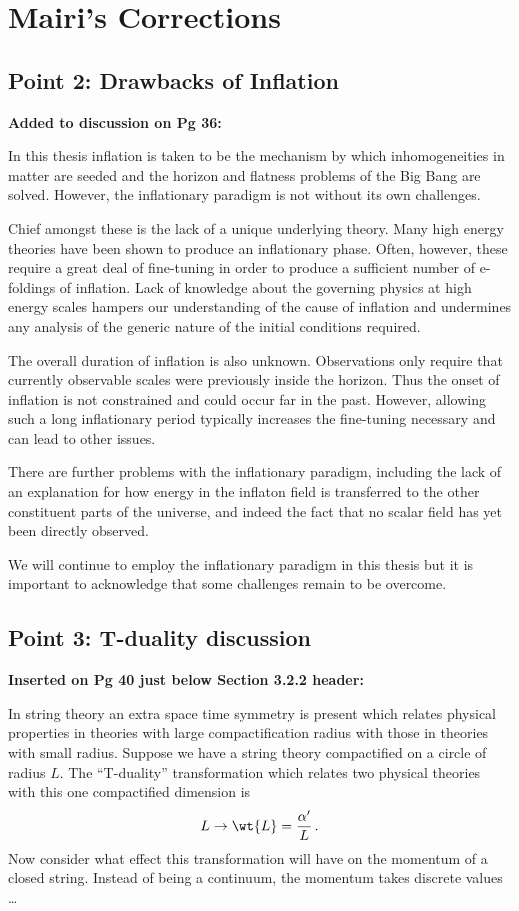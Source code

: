 \section{Mairi's Corrections}

\subsection{Point 2: Drawbacks of Inflation}
\textbf{Added to discussion on Pg 36:}

In this thesis inflation is taken to be the mechanism by which inhomogeneities in matter are seeded
and the horizon and flatness problems of the Big Bang are solved. However, the inflationary
paradigm is not without its own challenges.

Chief amongst these is the lack of a unique underlying theory. Many high energy theories have been
shown to produce an inflationary phase. Often, however, these require a great deal of fine-tuning
in order to produce a sufficient number of e-foldings of inflation. Lack of knowledge about the
governing physics at high energy scales hampers our understanding of the cause of inflation and
undermines any analysis of the generic nature of the initial conditions required.

The overall duration of inflation is also unknown. Observations only require that currently
observable scales were previously inside the horizon. Thus the onset of inflation is not
constrained and could occur far in the past. However, allowing such a long inflationary period
typically increases the fine-tuning necessary and can lead to other issues. 

There are further problems with the inflationary paradigm, including the lack of an explanation for
how energy in the inflaton field is transferred to the other constituent parts of the universe, and
indeed the fact that no scalar field has yet been directly observed.

We will continue to employ the inflationary paradigm in this thesis but it is important to
acknowledge that some challenges remain to be overcome.

\subsection{Point 3: T-duality discussion}
\textbf{Inserted on Pg 40 just below Section 3.2.2 header:}

In string theory an extra space time symmetry is present which relates physical properties in
theories with large compactification radius with those in theories with small radius. 
Suppose we have a string theory compactified on a circle of radius $L$. The ``T-duality''
transformation which relates two physical theories with this one compactified dimension is
% 
\begin{equation}
\label{eq:tdualtransform-dbiintro}
 L \rightarrow \wt{L} = \frac{\alpha'}{L}\,.
\end{equation}
% 
Now consider what effect this transformation will have on the momentum of a closed string. Instead
of being a continuum, the momentum takes discrete values \ldots
\\

